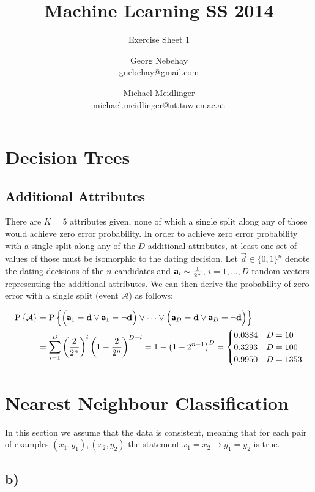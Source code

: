 \documentclass{scrartcl}
\title{Machine Learning SS 2014}
\subtitle{Exercise Sheet 1}
\author{Georg Nebehay\\gnebehay@gmail.com
\and
Michael Meidlinger\\
michael.meidlinger@nt.tuwien.ac.at
}
\date{}
\begin{document}
\maketitle

\section{Decision Trees}



\subsection{Additional Attributes}
There are $K=5$ attributes given, none of which a single split along any of those would achieve zero error probability. In order to achieve zero error probability with a single split along any of the $D$ additional attributes, at least one set of values of those must be isomorphic to the dating decision. Let $\vec d \in \lbrace 0,1\rbrace^n$ denote the dating decisions of the $n$ candidates and ${\textbf{\textsf{a}}}_i \sim \frac{1}{2^n}$, $i=1,\dots,D$  random vectors representing the additional attributes. We can then derive the probability of zero error with a single split (event $\mathcal A$) as follows:

\begin{align}
	\Prob{\mathcal A}& = 
	\Prob{ \Big(\rvec a_1 = \vec d \vee \rvec a_1 = \neg \vec d \Big) \vee 
		\dots \vee \Big(\rvec a_D = \vec d \vee \rvec a_D = \neg \vec d \Big)} \\
	&= \sum_{i=1}^{D}  \left( \frac{2}{2^n} \right)^i  \left( 1-\frac{2}{2^n}\right)^{D-i} 
	= 1- \left( 1-2^{n-1} \right)^{D} 
	= \begin{cases} 0.0384 &D=10 \\  0.3293 &D=100 \\ 0.9950 &D=1353\end{cases}
\end{align}

\section{Nearest Neighbour Classification}

In this section we assume that the data is consistent,
meaning that for each pair of examples $(x_1,y_1), (x_2,y_2)$ the statement
$x_1 = x_2 \rightarrow y_1 = y_2$ is true.

\subsection{b)}
\end{document}
